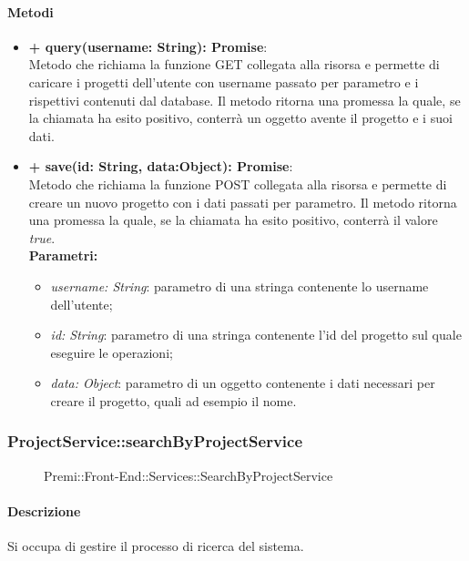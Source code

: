 		\paragraph{Metodi}
		\begin{itemize}
			\item \textbf{+ query(username: String): Promise}:\\
			Metodo che richiama la funzione GET collegata alla risorsa e permette di caricare i progetti dell'utente con username passato per parametro e i rispettivi contenuti dal database. Il metodo ritorna una promessa la quale, se la chiamata ha esito positivo, conterrà un oggetto avente il progetto e i suoi dati.\\
			\item \textbf{+ save(id: String, data:Object): Promise}:\\
			Metodo che richiama la funzione POST collegata alla risorsa e permette di creare un nuovo progetto con i dati passati per parametro. Il metodo ritorna una promessa la quale, se la chiamata ha esito positivo, conterrà il valore \textit{true}.\\
			\textbf{Parametri:}\\
			\begin{itemize}
				\item \textit{username: String}: parametro di una stringa contenente lo username dell'utente;
				\item \textit{id: String}: parametro di una stringa contenente l'id del progetto sul quale eseguire le operazioni;
				\item \textit{data: Object}: parametro di un oggetto contenente i dati necessari per creare il progetto, quali ad esempio il nome.
			\end{itemize}
		\end{itemize}
		
		
		\subsubsection{ProjectService::searchByProjectService}
		\begin{figure}[h]
			\centering
			\caption[Premi::Front-End::Services::SearchByProjectService]{Premi::Front-End::Services::SearchByProjectService}
		\end{figure}
		
		\paragraph{Descrizione}
		Si occupa di gestire il processo di ricerca del sistema.
		
